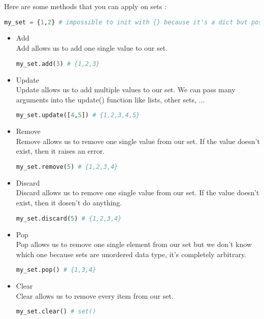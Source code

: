 \documentclass[a4paper, 12pt, titlepage]{scrartcl} %
\begin{document}
Here are some methods that you can apply on sets : 
\begin{lstlisting}[language=Python]
my_set = {1,2} # impossible to init with {} because it's a dict but possible with set()
\end{lstlisting} \vspace{5mm}

\begin{itemize}
\item Add \\
Add allows us to add one single value to our set.
\begin{lstlisting}[language=Python]
my_set.add(3) # {1,2,3} 
\end{lstlisting} \vspace{5mm}

\item Update \\
Update allows us to add multiple values to our set. We can pass many arguments into the update() function like lists, other sets, ...
\begin{lstlisting}[language=Python]
my_set.update([4,5]) # {1,2,3,4,5}
\end{lstlisting} \vspace{5mm}

\item Remove \\
Remove allows us to remove one single value from our set. If the value doesn't exist, then it raises an error.
\begin{lstlisting}[language=Python]
my_set.remove(5) # {1,2,3,4}
\end{lstlisting} \vspace{5mm}

\item Discard \\
Discard allows us to remove one single value from our set. If the value doesn't exist, then it dosen't do anything. 
\begin{lstlisting}[language=Python]
my_set.discard(5) # {1,2,3,4}
\end{lstlisting} \vspace{5mm}

\item Pop \\
Pop allows us to remove one single element from our set but we don't know which one because sets are unordered data type, it's completely arbitrary.
\begin{lstlisting}[language=Python]
my_set.pop() # {1,3,4}
\end{lstlisting} \vspace{5mm}

\item Clear \\
Clear allows us to remove every item from our set.
\begin{lstlisting}[language=Python]
my_set.clear() # set()
\end{lstlisting} \vspace{5mm}
\end{itemize} \vspace{5mm}
\end{document}
